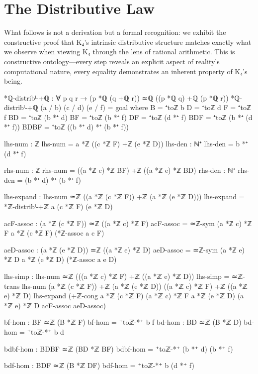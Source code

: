 \documentclass[11pt,a4paper]{book}
\begin{document}
\section{The Distributive Law}

What follows is not a derivation but a formal recognition: we exhibit the constructive proof that K₄'s intrinsic distributive structure matches exactly what we observe when viewing K₄ through the lens of rational arithmetic. This is constructive ontology—every step reveals an explicit aspect of reality's computational nature, every equality demonstrates an inherent property of K₄'s being.

\begin{code}
*ℚ-distribˡ-+ℚ : ∀ p q r → (p *ℚ (q +ℚ r)) ≃ℚ ((p *ℚ q) +ℚ (p *ℚ r))
*ℚ-distribˡ-+ℚ (a / b) (c / d) (e / f) = goal
  where
    B = ⁺toℤ b
    D = ⁺toℤ d
    F = ⁺toℤ f
    BD = ⁺toℤ (b *⁺ d)
    BF = ⁺toℤ (b *⁺ f)
    DF = ⁺toℤ (d *⁺ f)
    BDF = ⁺toℤ (b *⁺ (d *⁺ f))
    BDBF = ⁺toℤ ((b *⁺ d) *⁺ (b *⁺ f))
    
    lhs-num : ℤ
    lhs-num = a *ℤ ((c *ℤ F) +ℤ (e *ℤ D))
    lhs-den : ℕ⁺
    lhs-den = b *⁺ (d *⁺ f)
    
    rhs-num : ℤ
    rhs-num = ((a *ℤ c) *ℤ BF) +ℤ ((a *ℤ e) *ℤ BD)
    rhs-den : ℕ⁺
    rhs-den = (b *⁺ d) *⁺ (b *⁺ f)

    lhs-expand : lhs-num ≃ℤ ((a *ℤ (c *ℤ F)) +ℤ (a *ℤ (e *ℤ D)))
    lhs-expand = *ℤ-distribˡ-+ℤ a (c *ℤ F) (e *ℤ D)

    acF-assoc : (a *ℤ (c *ℤ F)) ≃ℤ ((a *ℤ c) *ℤ F)
    acF-assoc = ≃ℤ-sym {(a *ℤ c) *ℤ F} {a *ℤ (c *ℤ F)} (*ℤ-assoc a c F)
    
    aeD-assoc : (a *ℤ (e *ℤ D)) ≃ℤ ((a *ℤ e) *ℤ D)
    aeD-assoc = ≃ℤ-sym {(a *ℤ e) *ℤ D} {a *ℤ (e *ℤ D)} (*ℤ-assoc a e D)

    lhs-simp : lhs-num ≃ℤ (((a *ℤ c) *ℤ F) +ℤ ((a *ℤ e) *ℤ D))
    lhs-simp = ≃ℤ-trans {lhs-num} {(a *ℤ (c *ℤ F)) +ℤ (a *ℤ (e *ℤ D))} 
                {((a *ℤ c) *ℤ F) +ℤ ((a *ℤ e) *ℤ D)}
                lhs-expand
                (+ℤ-cong {a *ℤ (c *ℤ F)} {(a *ℤ c) *ℤ F} 
                        {a *ℤ (e *ℤ D)} {(a *ℤ e) *ℤ D}
                        acF-assoc aeD-assoc)

    bf-hom : BF ≃ℤ (B *ℤ F)
    bf-hom = ⁺toℤ-*⁺ b f
    bd-hom : BD ≃ℤ (B *ℤ D)
    bd-hom = ⁺toℤ-*⁺ b d

    bdbf-hom : BDBF ≃ℤ (BD *ℤ BF)
    bdbf-hom = ⁺toℤ-*⁺ (b *⁺ d) (b *⁺ f)
    
    bdf-hom : BDF ≃ℤ (B *ℤ DF)
    bdf-hom = ⁺toℤ-*⁺ b (d *⁺ f)


\end{code}
\end{document}
